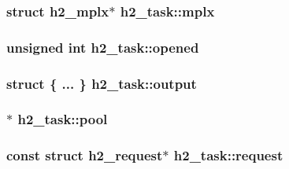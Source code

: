 \subsubsection[{\texorpdfstring{mplx}{mplx}}]{\setlength{\rightskip}{0pt plus 5cm}struct {\bf h2\+\_\+mplx}$\ast$ h2\+\_\+task\+::mplx}\hypertarget{structh2__task_a01c334a460577a071ad2c6c76ff55373}{}\label{structh2__task_a01c334a460577a071ad2c6c76ff55373}
\subsubsection[{\texorpdfstring{opened}{opened}}]{\setlength{\rightskip}{0pt plus 5cm}unsigned {\bf int} h2\+\_\+task\+::opened}\hypertarget{structh2__task_af7b6ebff364f73d968b7f13b7f5e9056}{}\label{structh2__task_af7b6ebff364f73d968b7f13b7f5e9056}
\subsubsection[{\texorpdfstring{output}{output}}]{\setlength{\rightskip}{0pt plus 5cm}struct \{ ... \}   h2\+\_\+task\+::output}\hypertarget{structh2__task_a3681f0a2c396a3e027ad2dc9b50c15ef}{}\label{structh2__task_a3681f0a2c396a3e027ad2dc9b50c15ef}
\subsubsection[{\texorpdfstring{pool}{pool}}]{$\ast$ h2\+\_\+task\+::pool}\hypertarget{structh2__task_a49fad74f9497dd0ede7236b13a59f228}{}\label{structh2__task_a49fad74f9497dd0ede7236b13a59f228}
\subsubsection[{\texorpdfstring{request}{request}}]{\setlength{\rightskip}{0pt plus 5cm}const struct {\bf h2\+\_\+request}$\ast$ h2\+\_\+task\+::request}\hypertarget{structh2__task_a2b29ed50bdcfa0549416978b8048cb78}{}\label{structh2__task_a2b29ed50bdcfa0549416978b8048cb78}
